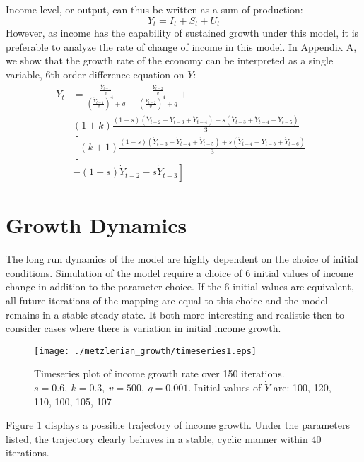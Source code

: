 Income level, or output, can thus be written as a sum of production:
\begin{equation}\label{eq:Income}
    Y_t=I_t+S_t+U_t
\end{equation}
However, as income has the capability of sustained growth under this model, it is preferable to analyze the rate of change of income in this model. In Appendix A, we show that the growth rate of the economy can be interpreted as a single variable, 6th order difference equation on $\dot Y$:
\begin{equation}
\begin{split}
    \dot Y_{t}& = \frac{\frac{\dot Y_{t-1}}{v}}{\left(\frac{\dot Y_{t-1}}{v}\right)^4+q}-\frac{\frac{\dot Y_{t-2}}{v}}{\left(\frac{\dot Y_{t-2}}{v}\right)^4+q} + \\
    & (1+k)\frac{(1-s)(\dot Y_{t-2}+\dot Y_{t-3}+\dot Y_{t-4})+s(\dot Y_{t-3}+\dot Y_{t-4}+\dot Y_{t-5})}{3} -\\
    &\left[(k+1)\frac{(1-s)(\dot Y_{t-3}+\dot Y_{t-4}+\dot Y_{t-5})+s(\dot Y_{t-4}+\dot Y_{t-5}+\dot Y_{t-6})}{3}\right.\\
    &\left.-(1-s)\dot Y_{t-2}-s\dot Y_{t-3}\right]
\end{split}
\end{equation}

\section{Growth Dynamics}
The long run dynamics of the model are highly dependent on the choice of initial conditions. Simulation of the model require a choice of 6 initial values of income change in addition to the parameter choice. If the 6 initial values are equivalent, all future iterations of the mapping are equal to this choice and the model remains in a stable steady state. It both more interesting and realistic then to consider cases where there is variation in initial income growth.
\begin{figure}[ht]
    \centering
    \texttt{[image: ./metzlerian\_growth/timeseries1.eps]}
    \caption{Timeseries plot of income growth rate over 150 iterations. $s=0.6,\ k=0.3,\ v=500,\ q=0.001$. Initial values of $\dot Y$ are: 100, 120, 110, 100, 105, 107}
    \label{growth_timeseries1}
\end{figure}
Figure \ref{growth_timeseries1} displays a possible trajectory of income growth. Under the parameters listed, the trajectory clearly behaves in a stable, cyclic manner within 40 iterations. 

